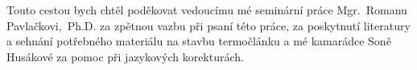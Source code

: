 Touto cestou bych chtěl poděkovat vedoucímu mé seminární práce Mgr.~Romanu
Pav\-lač\-kovi,~Ph.D. za zpětnou vazbu při psaní této práce, za poskytnutí
literatury a sehnání potřebného materiálu na stavbu termočlánku a mé kamarádce
Soně Husákové za pomoc při jazykových korekturách.
